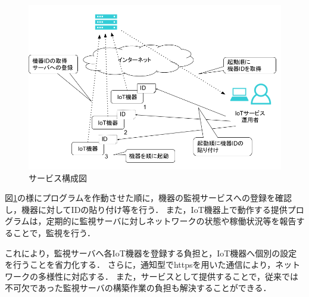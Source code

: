 \begin{figure}[htbp]
\includegraphics[width=16cm]{images/prop_diag2.png}
\caption{サービス構成図}
\label{fig:prop_diag2}
\end{figure}
図\ref{fig:prop_diag2}の様にプログラムを作動させた順に，機器の監視サービスへの登録を確認し，機器に対してIDの貼り付け等を行う．
また，IoT機器上で動作する提供プログラムは，定期的に監視サーバに対しネットワークの状態や稼働状況等を報告することで，監視を行う．

これにより，監視サーバへ各IoT機器を登録する負担と，IoT機器へ個別の設定を行うことを省力化する．
さらに，通知型でhttpsを用いた通信により，ネットワークの多様性に対応する．
また，サービスとして提供することで，従来では不可欠であった監視サーバの構築作業の負担も解決することができる．

